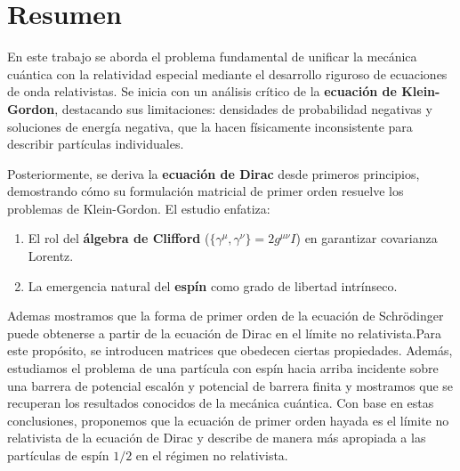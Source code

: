 \chapter*{Resumen} %
\lhead[\thepage]{\rightmark}
\rhead[\leftmark]{\thepage}
\setcounter{page}{3}


En este trabajo se aborda el problema fundamental de unificar la mecánica cuántica con la relatividad especial mediante el desarrollo riguroso de ecuaciones de onda relativistas. Se inicia con un análisis crítico de la \textbf{ecuación de Klein-Gordon}, destacando sus limitaciones: densidades de probabilidad negativas y soluciones de energía negativa, que la hacen físicamente inconsistente para describir partículas individuales.

Posteriormente, se deriva la \textbf{ecuación de Dirac} desde primeros principios, demostrando cómo su formulación matricial de primer orden resuelve los problemas de Klein-Gordon. El estudio enfatiza:

\begin{enumerate}
    \item El rol del \textbf{álgebra de Clifford} ($\{\gamma^\mu, \gamma^\nu\} = 2g^{\mu\nu}I$) en garantizar covarianza Lorentz.
    \item La emergencia natural del \textbf{espín} como grado de libertad intrínseco.
\end{enumerate}

Ademas mostramos que la forma de primer orden de la ecuación de Schrödinger puede obtenerse a partir de la ecuación de Dirac en el límite no relativista.Para este propósito, se introducen matrices que obedecen ciertas propiedades. Además, estudiamos el problema de una partícula con espín hacia arriba incidente sobre una barrera de potencial escalón y potencial de barrera finita y mostramos que se recuperan los resultados conocidos de la mecánica cuántica. Con base en estas conclusiones, proponemos que la ecuación de primer orden hayada es el límite no relativista de la ecuación de Dirac y describe de manera más apropiada a las partículas de espín $1/2$ en el régimen no relativista.
\vspace{0.5cm}
\noindent

